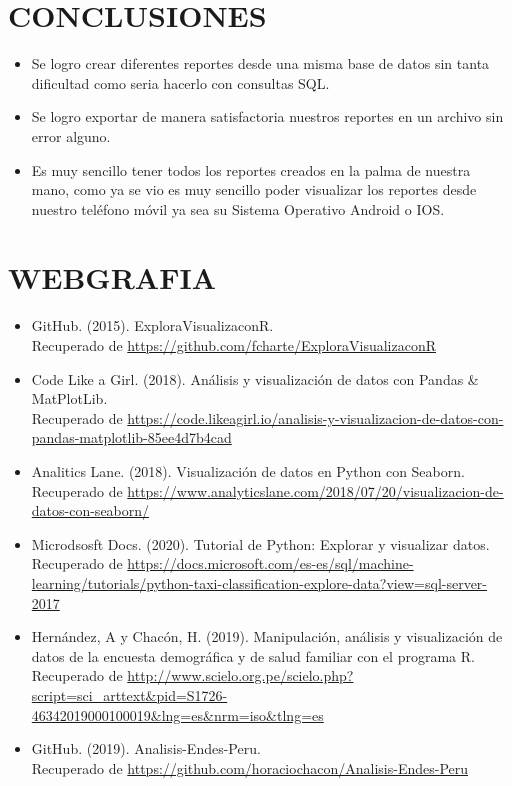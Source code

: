 \documentclass[12pt,letterpaper]{article}
\begin{document}
    \newpage
    \section{CONCLUSIONES}
    \begin{itemize}
        \item Se logro crear diferentes reportes desde una misma base de datos sin tanta dificultad como seria hacerlo con consultas SQL.
        \item Se logro exportar de manera satisfactoria nuestros reportes en un archivo sin error alguno.
        \item Es muy sencillo tener todos los reportes creados en la palma de nuestra mano, como ya se vio es muy sencillo poder visualizar los reportes desde nuestro teléfono móvil ya sea su Sistema Operativo Android o IOS.
    \end{itemize}
    
    \newpage
    \section{WEBGRAFIA}
    \begin{itemize}
        \item GitHub. (2015). ExploraVisualizaconR.\\
        Recuperado de \textcolor{azul}{\url{https://github.com/fcharte/ExploraVisualizaconR}}
        \item Code Like a Girl. (2018). Análisis y visualización de datos con Pandas \& MatPlotLib.\\
        Recuperado de \textcolor{azul}{\url{https://code.likeagirl.io/analisis-y-visualizacion-de-datos-con-pandas-matplotlib-85ee4d7b4cad}}
        \item Analitics Lane. (2018). Visualización de datos en Python con Seaborn.\\
        Recuperado de \textcolor{azul}{\url{https://www.analyticslane.com/2018/07/20/visualizacion-de-datos-con-seaborn/}}
        \item Microdsosft Docs. (2020). Tutorial de Python: Explorar y visualizar datos.\\
        Recuperado de \textcolor{azul}{\url{https://docs.microsoft.com/es-es/sql/machine-learning/tutorials/python-taxi-classification-explore-data?view=sql-server-2017}}
        \item Hernández, A y Chacón, H. (2019). Manipulación, análisis y visualización de datos de la encuesta demográfica y de salud familiar con el programa R.\\
        Recuperado de \textcolor{azul}{\url{http://www.scielo.org.pe/scielo.php?script=sci_arttext&pid=S1726-46342019000100019&lng=es&nrm=iso&tlng=es}}
        \item GitHub. (2019). Analisis-Endes-Peru.\\
        Recuperado de \textcolor{azul}{\url{https://github.com/horaciochacon/Analisis-Endes-Peru}}
    \end{itemize}
\end{document}

